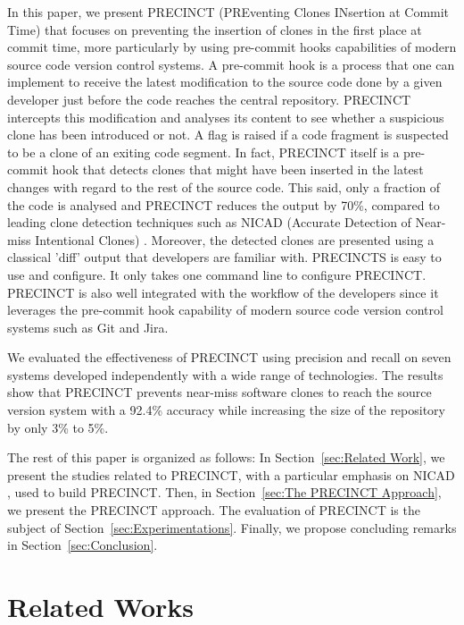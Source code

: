\documentclass[conference]{IEEEtran}
\begin{document}
In this paper, we present PRECINCT (PREventing Clones INsertion at Commit Time) that focuses on preventing the insertion of clones in the first place at commit time, more particularly by  using pre-commit hooks capabilities of modern source code version control systems.
A pre-commit hook is a process that one can implement to receive the latest modification to the source code done by a given developer just before the code reaches the central repository.
PRECINCT intercepts this modification and analyses its  content to see whether a suspicious clone has been introduced or not.
A flag is raised if a code fragment is suspected to be a clone of an exiting code segment.
In fact, PRECINCT itself is a pre-commit hook that detects clones that might have been inserted in the latest changes with regard to the rest of the source code.
This said, only a fraction of the code is analysed and PRECINCT reduces the output by 70\%, compared to leading clone detection techniques such as NICAD (Accurate Detection of Near-miss Intentional Clones) \cite{Cordy2011}.
Moreover, the detected clones are presented using a classical 'diff' output that developers are familiar with.  PRECINCTS is easy to use and configure.
It only takes  one command line to configure PRECINCT.
PRECINCT is also well integrated with the workflow of the developers since it leverages the pre-commit hook capability of modern source code version control systems such as Git and Jira.

We evaluated the effectiveness of PRECINCT using precision and recall on seven systems developed independently with a wide range of technologies.
The results show that PRECINCT prevents near-miss software clones to reach the source version system with a 92.4\% accuracy while increasing the size of the repository by only 3\% to 5\%.

The rest of this paper is organized as follows: In Section~\ref{sec:Related Work}, we present the studies related to PRECINCT, with a particular emphasis on NICAD \cite{Cordy2011}, used to build PRECINCT. Then, in Section~\ref{sec:The PRECINCT Approach}, we present the PRECINCT approach. The evaluation of PRECINCT is the subject of  Section~\ref{sec:Experimentations}.
Finally, we propose concluding remarks in Section~\ref{sec:Conclusion}.

\section{Related Works}
\label{sec:Related Works}
\end{document}
